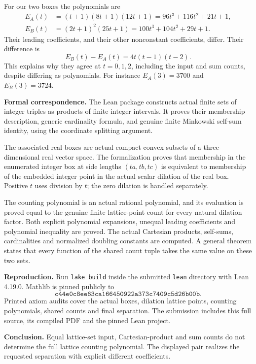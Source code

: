 \documentclass[11pt]{article}
\begin{document}
For our two boxes the polynomials are
\[
 \begin{aligned}
 E_A(t)&=(t+1)(8t+1)(12t+1)
       =96t^3+116t^2+21t+1,\\
 E_B(t)&=(2t+1)^2(25t+1)
       =100t^3+104t^2+29t+1.
 \end{aligned}
\]
Their leading coefficients, and their other nonconstant coefficients, differ. Their difference is
\[
 E_B(t)-E_A(t)=4t(t-1)(t-2).
\]
This explains why they agree at $t=0,1,2$, including the input and sum counts, despite differing as polynomials. For instance $E_A(3)=3700$ and $E_B(3)=3724$.

\textbf{Formal correspondence.}
The Lean package constructs actual finite sets of integer triples as products of finite integer intervals. It proves their membership description, generic cardinality formula, and genuine finite Minkowski self-sum identity, using the coordinate splitting argument.

The associated real boxes are actual compact convex subsets of a three-dimensional real vector space. The formalization proves that membership in the enumerated integer box at side lengths $(ta,tb,tc)$ is equivalent to membership of the embedded integer point in the actual scalar dilation of the real box. Positive $t$ uses division by $t$; the zero dilation is handled separately.

The counting polynomial is an actual rational polynomial, and its evaluation is proved equal to the genuine finite lattice-point count for every natural dilation factor. Both explicit polynomial expansions, unequal leading coefficients and polynomial inequality are proved. The actual Cartesian products, self-sums, cardinalities and normalized doubling constants are computed. A general theorem states that every function of the shared count tuple takes the same value on these two sets.

\textbf{Reproduction.}
Run \texttt{lake build} inside the submitted \texttt{lean} directory with Lean 4.19.0. Mathlib is pinned publicly to
\[
 \texttt{c44e0c8ee63ca166450922a373c7409c5d26b00b}.
\]
Printed axiom audits cover the actual boxes, dilation lattice points, counting polynomials, shared counts and final separation. The submission includes this full source, its compiled PDF and the pinned Lean project.

\textbf{Conclusion.}
Equal lattice-set input, Cartesian-product and sum counts do not determine the full lattice counting polynomial. The displayed pair realizes the requested separation with explicit different coefficients.
\end{document}
